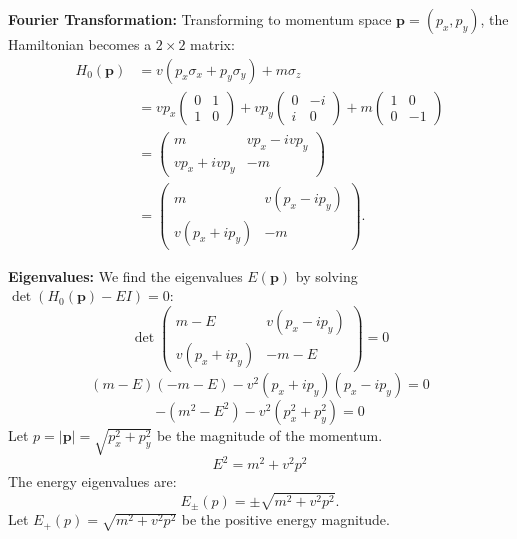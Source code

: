 \documentclass[11pt]{article}
\begin{document}
\textbf{Fourier Transformation:}
Transforming to momentum space $\mathbf{p} = (p_x, p_y)$, the Hamiltonian becomes a $2 \times 2$ matrix:
\begin{align} H_0(\mathbf{p}) &= v (p_x \sigma_x + p_y \sigma_y) + m \sigma_z \\ &= v p_x \begin{pmatrix} 0 & 1 \\ 1 & 0 \end{pmatrix} + v p_y \begin{pmatrix} 0 & -i \\ i & 0 \end{pmatrix} + m \begin{pmatrix} 1 & 0 \\ 0 & -1 \end{pmatrix} \\ &= \begin{pmatrix} m & v p_x - i v p_y \\ v p_x + i v p_y & -m \end{pmatrix} \\ &= \begin{pmatrix} m & v(p_x - i p_y) \\ v(p_x + i p_y) & -m \end{pmatrix}. \label{eq:2D_H_matrix}\end{align}

\textbf{Eigenvalues:}
We find the eigenvalues $E(\mathbf{p})$ by solving $\det(H_0(\mathbf{p}) - E I) = 0$:
\[ \det \begin{pmatrix} m - E & v(p_x - i p_y) \\ v(p_x + i p_y) & -m - E \end{pmatrix} = 0 \]
\[ (m - E)(-m - E) - v^2 (p_x + i p_y)(p_x - i p_y) = 0 \]
\[ -(m^2 - E^2) - v^2 (p_x^2 + p_y^2) = 0 \]
Let $p = |\mathbf{p}| = \sqrt{p_x^2 + p_y^2}$ be the magnitude of the momentum.
\[ E^2 = m^2 + v^2 p^2 \]
The energy eigenvalues are:
\begin{equation}
E_{\pm}(p) = \pm \sqrt{m^2 + v^2 p^2}.
\label{eq:2D_eigenvalues}
\end{equation}
Let $E_+(p) = \sqrt{m^2 + v^2 p^2}$ be the positive energy magnitude.
\end{document}
